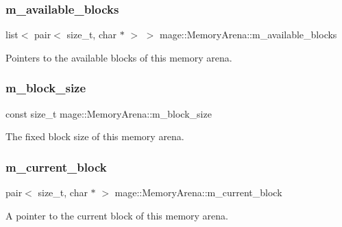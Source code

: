 \subsubsection{\texorpdfstring{m\+\_\+available\+\_\+blocks}{m\_available\_blocks}}
{\footnotesize\ttfamily list$<$ pair$<$ size\+\_\+t, char $\ast$ $>$ $>$ mage\+::\+Memory\+Arena\+::m\+\_\+available\+\_\+blocks\hspace{0.3cm}{\ttfamily [protected]}}

Pointers to the available blocks of this memory arena. \hypertarget{classmage_1_1_memory_arena_a18177c245b045c5536330ffed284ed4d}{}\label{classmage_1_1_memory_arena_a18177c245b045c5536330ffed284ed4d} 
\subsubsection{\texorpdfstring{m\+\_\+block\+\_\+size}{m\_block\_size}}
{\footnotesize\ttfamily const size\+\_\+t mage\+::\+Memory\+Arena\+::m\+\_\+block\+\_\+size\hspace{0.3cm}{\ttfamily [protected]}}

The fixed block size of this memory arena. \hypertarget{classmage_1_1_memory_arena_ab2d39233b1e64239baea519a2d073b04}{}\label{classmage_1_1_memory_arena_ab2d39233b1e64239baea519a2d073b04} 
\subsubsection{\texorpdfstring{m\+\_\+current\+\_\+block}{m\_current\_block}}
{\footnotesize\ttfamily pair$<$ size\+\_\+t, char $\ast$ $>$ mage\+::\+Memory\+Arena\+::m\+\_\+current\+\_\+block\hspace{0.3cm}{\ttfamily [protected]}}

A pointer to the current block of this memory arena. \hypertarget{classmage_1_1_memory_arena_a880d07eb372ce1c8b907947fcbdfc59c}{}\label{classmage_1_1_memory_arena_a880d07eb372ce1c8b907947fcbdfc59c} 
